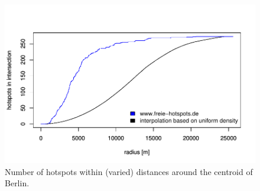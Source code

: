 \begin{figure}[tbp]
	\centering
	\includegraphics[scale=0.6]{imgs/wifi_distributions.pdf}
	\caption{Number of hotspots within (varied) distances around the centroid of Berlin.}
	\label{fig:wifi_distributions}
\end{figure}
